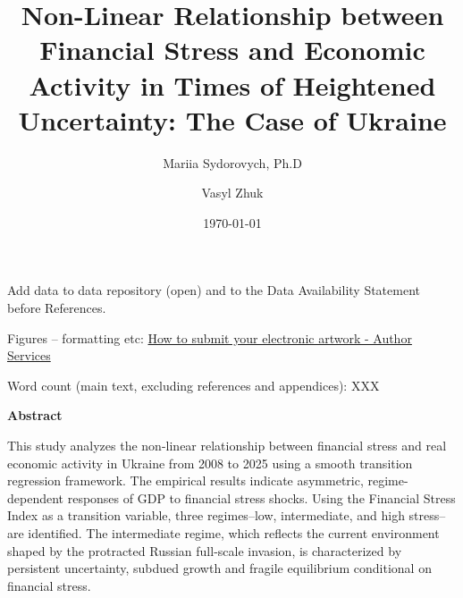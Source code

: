 \documentclass[12pt,preprint,aps,author-year]{revtex4-1}
\begin{document}
\renewcommand{\arraystretch}{1.2}
\sloppy
\renewcommand{\baselinestretch}{2.0}
\normalsize
\renewcommand\theadalign{tl}
\renewcommand\theadfont{\normalsize\bfseries}
\renewcommand\theadgape{\Gape[4pt]}
\renewcommand\cellalign{tl}
\newcommand{\Varcell}[1]{\parbox[t]{2.8cm}{\raggedright #1}}
\newcommand{\Desccell}[1]{\parbox[t]{4.2cm}{\raggedright #1}}

\title{Non-Linear Relationship between Financial Stress and Economic Activity in Times of Heightened Uncertainty: The Case of Ukraine}

\date{\today}

\author{Mariia Sydorovych, Ph.D}

\author{Vasyl Zhuk}

\maketitle

Add data to data repository (open) and to the Data Availability Statement before References.

Figures -- formatting etc: \href{https://authorservices.taylorandfrancis.com/publishing-your-research/making-your-submission/submit-electronic-artwork/}{How to submit your electronic artwork - Author Services}

Word count (main text, excluding references and appendices): XXX

\textbf{Abstract}

This study analyzes the non-linear relationship between financial stress and real economic activity in Ukraine from 2008 to 2025 using a smooth transition regression framework. The empirical results indicate asymmetric, regime-dependent responses of GDP to financial stress shocks. Using the Financial Stress Index as a transition variable, three regimes–low, intermediate, and high stress–are identified. The intermediate regime, which reflects the current environment shaped by the protracted Russian full-scale invasion, is characterized by persistent uncertainty, subdued growth and fragile equilibrium conditional on financial stress.
\end{document}
